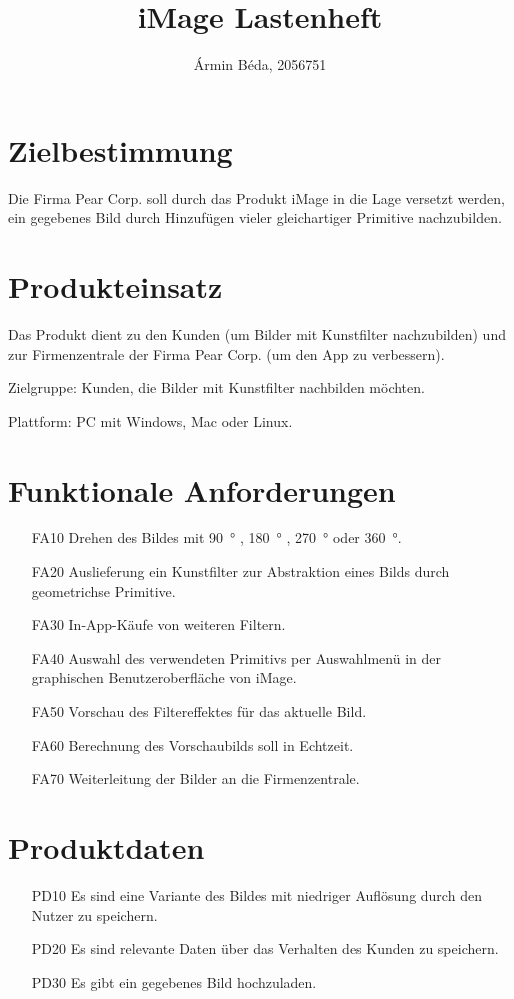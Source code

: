 \documentclass[parskip=full]{scrartcl}
\title{iMage Lastenheft}
\author{Ármin Béda, 2056751}
\begin{document}
\maketitle



%
%
\section{Zielbestimmung}
Die Firma Pear Corp. soll durch das Produkt iMage in die Lage versetzt werden, ein gegebenes Bild durch Hinzufügen vieler gleichartiger \gls{Primitiv}e nachzubilden.

\section{Produkteinsatz}
Das Produkt dient zu den Kunden (um Bilder mit \gls{Kunstfilter} nachzubilden) und zur \gls{Firmenzentrale} der Firma Pear Corp. (um den App zu verbessern).

Zielgruppe: Kunden, die Bilder mit \gls{Kunstfilter} nachbilden möchten.

Plattform: PC mit Windows, Mac oder Linux. 

\section{Funktionale Anforderungen}
\begin{itemize}[nosep]
\item[FA10] Drehen des Bildes mit \SI{90}{\degree} ,  \SI{180}{\degree} ,  \SI{270}{\degree} oder  \SI{360}{\degree}.
\item[FA20] Auslieferung ein \gls{Kunstfilter} zur Abstraktion eines Bilds durch geometrichse \gls{Primitiv}e.
\item[FA30] In-App-Käufe von weiteren Filtern.
\item[FA40] Auswahl des verwendeten Primitivs per Auswahlmenü in der graphischen Benutzeroberfläche von iMage.
\item[FA50] Vorschau des Filtereffektes für das aktuelle Bild.
\item[FA60] Berechnung des Vorschaubilds soll in Echtzeit.
\item[FA70] Weiterleitung der Bilder an die Firmenzentrale.
\end{itemize}

\section{Produktdaten}
\begin{itemize}[nosep]
\item[PD10] Es sind eine Variante des Bildes mit niedriger Auflösung durch den \gls{Nutzer} zu speichern.
\item[PD20] Es sind relevante Daten über das Verhalten des \gls{Kunde}n zu speichern.
\item[PD30] Es gibt ein gegebenes Bild hochzuladen.
\end{itemize}
\end{document}
